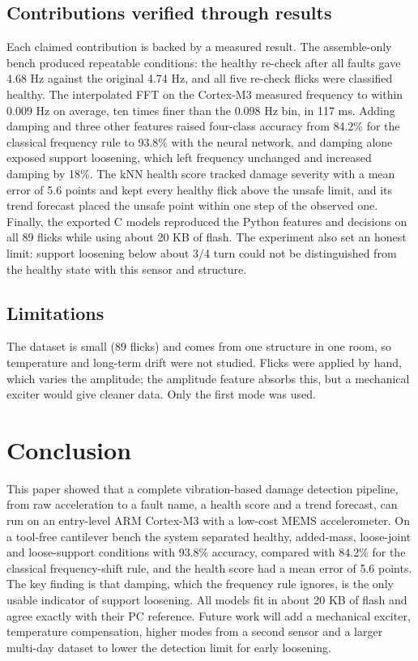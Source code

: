 \documentclass[conference]{IEEEtran}
\begin{document}
\subsection{Contributions verified through results}
Each claimed contribution is backed by a measured result. The assemble-only bench produced repeatable conditions: the healthy re-check after all faults gave 4.68 Hz against the original 4.74 Hz, and all five re-check flicks were classified healthy. The interpolated FFT on the Cortex-M3 measured frequency to within 0.009 Hz on average, ten times finer than the 0.098 Hz bin, in 117 ms. Adding damping and three other features raised four-class accuracy from 84.2\% for the classical frequency rule to 93.8\% with the neural network, and damping alone exposed support loosening, which left frequency unchanged and increased damping by 18\%. The kNN health score tracked damage severity with a mean error of 5.6 points and kept every healthy flick above the unsafe limit, and its trend forecast placed the unsafe point within one step of the observed one. Finally, the exported C models reproduced the Python features and decisions on all 89 flicks while using about 20 KB of flash. The experiment also set an honest limit: support loosening below about 3/4 turn could not be distinguished from the healthy state with this sensor and structure.

\subsection{Limitations}
The dataset is small (89 flicks) and comes from one structure in one room, so temperature and long-term drift were not studied. Flicks were applied by hand, which varies the amplitude; the amplitude feature absorbs this, but a mechanical exciter would give cleaner data. Only the first mode was used.

\section{Conclusion}
This paper showed that a complete vibration-based damage detection pipeline, from raw acceleration to a fault name, a health score and a trend forecast, can run on an entry-level ARM Cortex-M3 with a low-cost MEMS accelerometer. On a tool-free cantilever bench the system separated healthy, added-mass, loose-joint and loose-support conditions with 93.8\% accuracy, compared with 84.2\% for the classical frequency-shift rule, and the health score had a mean error of 5.6 points. The key finding is that damping, which the frequency rule ignores, is the only usable indicator of support loosening. All models fit in about 20 KB of flash and agree exactly with their PC reference. Future work will add a mechanical exciter, temperature compensation, higher modes from a second sensor and a larger multi-day dataset to lower the detection limit for early loosening.
\end{document}
